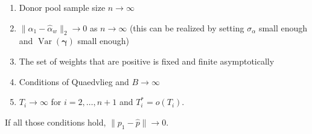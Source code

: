 \documentclass[12pt]{article}
\def\bs#1{\boldsymbol{#1}}
\DeclareMathOperator{\Var}{Var} %
\theoremstyle{definition}
\theoremstyle{definition}
\begin{document}
\begin{enumerate}
  \item Donor pool sample size $n \to \infty$
  \item $\|\alpha_1 - \hat{\alpha}_{w} \|_2 \to 0$ as $n\to \infty$ (this can be realized by setting $\sigma_{\alpha}$ small enough and $\Var(\bs{\gamma} )$ small enough)
  \item The set of weights that are positive is fixed and finite asymptotically 
  \item Conditions of Quaedvlieg and $B \to \infty$
  \item $T_i \to \infty$ for $i = 2,\ldots, n+1$ and $T_i^* =o(T_i)$.
\end{enumerate}


If all those conditions hold, $\| p_1-\hat{p}\| \to 0$.





  
\end{document}
